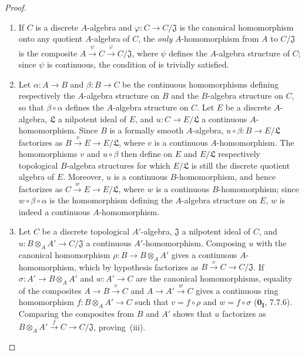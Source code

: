 
\begin{proof}
\begin{enumerate}
  \item[(i)] If $C$ is a discrete $A$-algebra and
  $\varphi:C\to C/\mathfrak{J}$ is the canonical homomorphism onto any
  quotient $A$-algebra of $C$, the \emph{only} $A$-homomorphism from $A$ to
  $C/\mathfrak{J}$ is the composite
  $A\xrightarrow{\psi}C\xrightarrow{\varphi}C/\mathfrak{J}$, where $\psi$
  defines the $A$-algebra structure of $C$; since $\psi$ is continuous, the
  condition of  is trivially satisfied.

  \item[(ii)] Let $\alpha:A\to B$ and $\beta:B\to C$ be the continuous
  homomorphisms defining respectively the $A$-algebra structure on $B$ and the
  $B$-algebra structure on $C$, so that $\beta\circ\alpha$ defines the
  $A$-algebra structure on $C$. Let $E$ be a discrete $A$-algebra,
  $\mathfrak{L}$ a nilpotent ideal of $E$, and
  $u:C\to E/\mathfrak{L}$ a continuous $A$-homomorphism. Since $B$ is a
  formally smooth $A$-algebra, $u\circ\beta:B\to E/\mathfrak{L}$ factorizes as
  $B\xrightarrow{v}E\to E/\mathfrak{L}$, where $v$ is a continuous
  $A$-homomorphism. The homomorphisms $v$ and $u\circ\beta$ then define on $E$
  and $E/\mathfrak{L}$ respectively topological $B$-algebra structures for
  which $E/\mathfrak{L}$ is still the discrete quotient algebra of $E$.
  Moreover, $u$ is a continuous $B$-homomorphism, and hence factorizes as
  $C\xrightarrow{w}E\to E/\mathfrak{L}$, where $w$ is a continuous
  $B$-homomorphism; since $w\circ\beta\circ\alpha$ is the homomorphism defining
  the $A$-algebra structure on $E$, $w$ is indeed a continuous
  $A$-homomorphism.

  \item[(iii)] Let $C$ be a discrete topological $A'$-algebra,
  $\mathfrak{J}$ a nilpotent ideal of $C$, and
  $u:B\otimes_A A'\to C/\mathfrak{J}$ a continuous $A'$-homomorphism. Composing
  $u$ with the canonical homomorphism
  $\rho:B\to B\otimes_A A'$ gives a continuous $A$-homomorphism, which by
  hypothesis factorizes as $B\xrightarrow{v}C\to C/\mathfrak{J}$. If
  $\sigma:A'\to B\otimes_A A'$ and $w:A'\to C$ are the canonical
  homomorphisms, equality of the composites $A\to B\xrightarrow{v}C$ and
  $A\to A'\xrightarrow{w}C$ gives a continuous ring homomorphism
  $f:B\otimes_A A'\to C$ such that $v=f\circ\rho$ and $w=f\circ\sigma$
  ($\mathbf{0_I}$, 7.7.6). Comparing the composites from $B$ and $A'$ shows
  that $u$ factorizes as
  $B\otimes_A A'\xrightarrow{f}C\to C/\mathfrak{J}$, proving~(iii).


\end{enumerate}
\end{proof}
